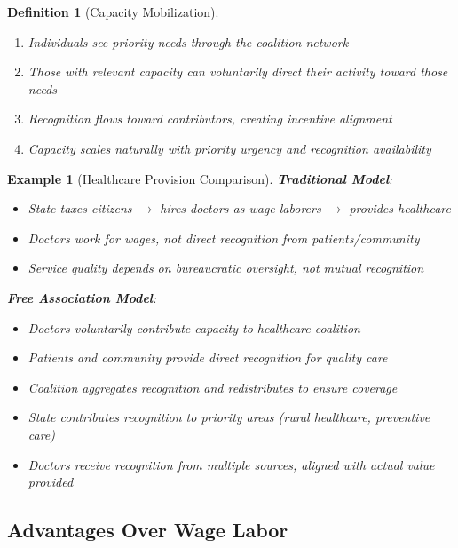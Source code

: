 \documentclass[11pt]{article}
\newtheorem{definition}{Definition}
\newtheorem{example}{Example}
\begin{document}
\begin{definition}[Capacity Mobilization]
\begin{enumerate}
\item Individuals see priority needs through the coalition network
\item Those with relevant capacity can voluntarily direct their activity toward those needs
\item Recognition flows toward contributors, creating incentive alignment
\item Capacity scales naturally with priority urgency and recognition availability
\end{enumerate}
\end{definition}

\begin{example}[Healthcare Provision Comparison]
\textbf{Traditional Model}:
\begin{itemize}
\item State taxes citizens $\to$ hires doctors as wage laborers $\to$ provides healthcare
\item Doctors work for wages, not direct recognition from patients/community
\item Service quality depends on bureaucratic oversight, not mutual recognition
\end{itemize}

\textbf{Free Association Model}:
\begin{itemize}
\item Doctors voluntarily contribute capacity to healthcare coalition
\item Patients and community provide direct recognition for quality care
\item Coalition aggregates recognition and redistributes to ensure coverage
\item State contributes recognition to priority areas (rural healthcare, preventive care)
\item Doctors receive recognition from multiple sources, aligned with actual value provided
\end{itemize}
\end{example}

\subsection{Advantages Over Wage Labor}
\end{document}
